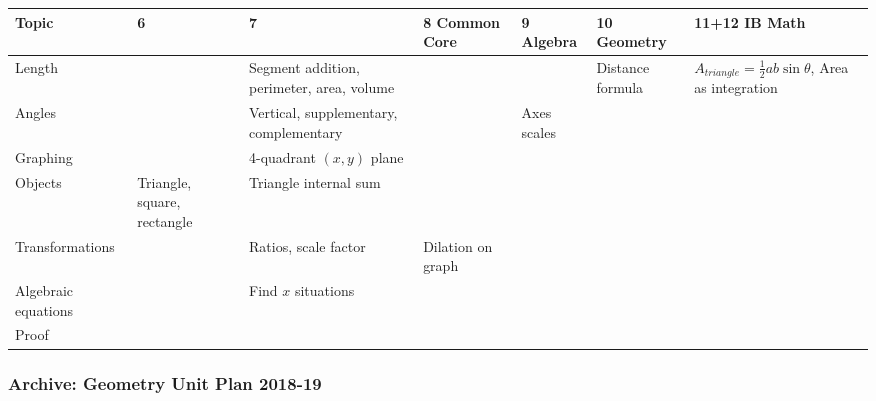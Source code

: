 \documentclass[12pt, twoside]{article}
\begin{document}
\begin{tabular}{|p{3cm}|p{2cm}|p{4cm}|p{2cm}|p{2cm}|p{3.5cm}|p{4cm}|}
  \hline
  Topic & 6 & 7 & 8 Common Core & 9 Algebra & 10 Geometry & 11+12 IB Math \\
  \hline \hline
  Length &  & Segment addition, perimeter, area, volume &  &  & Distance formula & $A_{triangle}=\frac{1}{2}ab \sin \theta$, Area as integration \\
  \hline
  Angles &  & Vertical, supplementary, complementary & & Axes scales & & \\
  \hline
  Graphing &  & 4-quadrant $(x,y)$ plane &  &  & & \\
  \hline
  Objects & Triangle, square, rectangle  & Triangle internal sum & & & & \\
  \hline
  Transformations &  & Ratios, scale factor & Dilation on graph  & & & \\
  \hline
  Algebraic equations & & Find $x$ situations & & & & \\
  \hline
  Proof & & & & & & \\
  \hline
\end{tabular}

\newpage
\subsubsection*{Archive: Geometry Unit Plan 2018-19}
\end{document}
